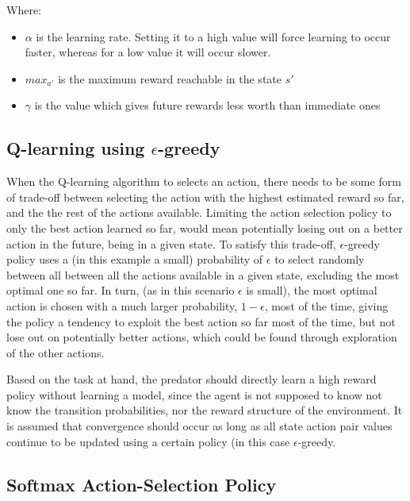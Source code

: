 \documentclass[11pt]{article}
\begin{document}
\noindent Where:
\begin{itemize}
	\item $\alpha$ is the learning rate. Setting it to a high value will force learning to occur faster, whereas for a low value it will occur slower.
	\item $max_{a'}$ is the maximum reward reachable in the state $s'$
	\item $\gamma$ is the value which gives future rewards less worth than immediate ones
\end{itemize}
\vspace*{10mm}


\subsection{Q-learning using $\epsilon$-greedy}

When the Q-learning algorithm to selects an action, there needs to be some form of trade-off between selecting the action with the highest estimated reward so far, and the the rest of the actions available. Limiting the action selection policy to only the best action learned so far, would mean potentially losing out  on a better action in the future, being in a given state. To satisfy this trade-off, $\epsilon$-greedy policy uses a (in this example a small) probability of $\epsilon$ to select randomly between all  between all the actions available in a given state, excluding the most optimal one so far. In turn, (as in this scenario $\epsilon$ is small), the most optimal action is chosen with a much larger probability, $1-\epsilon$, most of the time, giving the policy a tendency to exploit the best action so far most of the time, but not lose out on potentially better actions, which could be found through exploration of the other actions. 



Based on the task at hand, the predator should directly learn a high reward policy without learning a model, since the agent is not supposed to know not know the transition probabilities, nor the reward structure of the environment. It is assumed that convergence should occur as long as all state action pair values continue to be updated using a certain policy (in this case $\epsilon$-greedy. 





\subsection{Softmax Action-Selection Policy}
\end{document}
